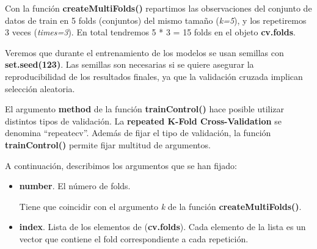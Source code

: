 \documentclass[]{article}
\newenvironment{Shaded}{\begin{snugshade}}{\end{snugshade}}
\newcommand{\DataTypeTok}[1]{\textcolor[rgb]{0.13,0.29,0.53}{#1}}
\newcommand{\DecValTok}[1]{\textcolor[rgb]{0.00,0.00,0.81}{#1}}
\newcommand{\KeywordTok}[1]{\textcolor[rgb]{0.13,0.29,0.53}{\textbf{#1}}}
\newcommand{\NormalTok}[1]{#1}
\newcommand{\OperatorTok}[1]{\textcolor[rgb]{0.81,0.36,0.00}{\textbf{#1}}}
\newcommand{\OtherTok}[1]{\textcolor[rgb]{0.56,0.35,0.01}{#1}}
\newcommand{\StringTok}[1]{\textcolor[rgb]{0.31,0.60,0.02}{#1}}
\providecommand{\tightlist}{%
  \setlength{\itemsep}{0pt}\setlength{\parskip}{0pt}}
\begin{document}
Con la función \textbf{createMultiFolds()} repartimos las observaciones del conjunto de datos de train en 5 folds (conjuntos) del mismo tamaño (\emph{k=5}), y los repetiremos 3 veces (\emph{times=3}). En total tendremos 5 * 3 = 15 folds en el objeto \textbf{cv.folds}.

Veremos que durante el entrenamiento de los modelos se usan semillas con \textbf{set.seed(123)}. Las semillas son necesarias si se quiere asegurar la reproducibilidad de los resultados finales, ya que la validación cruzada implican selección aleatoria.

\vspace{3mm}

\begin{Shaded}
\end{Shaded}

El argumento \textbf{method} de la función \textbf{trainControl()} hace
posible utilizar distintos tipos de validación. La \textbf{repeated K-Fold Cross-Validation} se denomina
``repeatecv''. Además de fijar el tipo de validación, la función \textbf{trainControl()} permite
fijar multitud de argumentos. 

A continuación, describimos los argumentos que se han fijado:

\begin{itemize}
\tightlist
\item
  \textbf{number}. El número de folds. 
  
  Tiene que coincidir con el argumento \textit{k} de la función \textbf{createMultiFolds()}. 
\item
  \textbf{index}. Lista de los elementos de (\textbf{cv.folds}). Cada elemento de la lista es un vector que contiene el fold correspondiente a cada repetición. 
\end{itemize}
\end{document}
